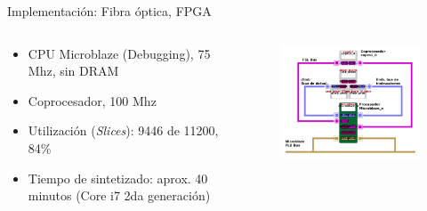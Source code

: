 \documentclass[aspectratio=169]{beamer}
\begin{document}
\begin{frame}{Implementación: Fibra óptica, FPGA}


\begin{columns}
  \begin{column}{0.35\textwidth}

   
\begin{itemize}
 \item CPU Microblaze (Debugging), 75 Mhz, sin DRAM
 \item Coprocesador, 100 Mhz
 \item Utilización (\textit{Slices}): 9446 de 11200, \alert{84\%}
 \item Tiempo de sintetizado: aprox. 40 minutos (Core i7 2da generación)
 
 \end{itemize}

  \end{column}
  \begin{column}{0.65\textwidth}

  \begin{figure}[t]
  \centering
    \includegraphics[width=3.5in]{../graphs/diagramaXilinx.png}
\label{fig:fpgahard}
\end{figure}

  \end{column}
\end{columns}



\end{frame}
\end{document}
